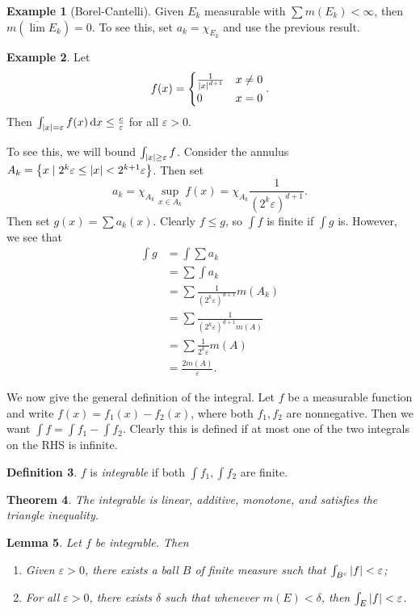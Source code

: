 \documentclass[leqno, openany]{memoir}
\newtheorem{thm}{Theorem}[chapter]
\newtheorem{lem}[thm]{Lemma}
\theoremstyle{definition}
\newtheorem{defn}[thm]{Definition}
\newtheorem{exm}[thm]{Example}
\theoremstyle{remark}
\theoremstyle{plain}
\theoremstyle{definition}
\theoremstyle{remark}
\newcommand{\ep}{\varepsilon}
\newcommand{\ol}[1]{\overline{#1}}
\begin{document}
\begin{exm}[Borel-Cantelli]
    Given $E_k$ measurable with $\sum m(E_k) < \infty$, then $m(\ol{\lim} E_k) = 0$. To see this, set $a_k = \chi_{E_k}$ and use the previous result.
\end{exm}

\begin{exm}
    Let 
    \[ f(x) = \begin{cases}
        \frac{1}{\abs{x}^{d+1}} & x \neq 0 \\
        0 & x = 0
    \end{cases}. \]
    Then $\int_{\abs{x}=\ep} f(x) \dd{x} \leq \frac{c}{\ep}$ for all $\ep > 0$.

    To see this, we will bound $\int_{\abs{x} \geq \ep} f$. Consider the annulus $A_k = \qty{x \mid 2^k \ep \leq \abs{x} < 2^{k+1} \ep}$. Then set
    \[ a_k = \chi_{A_k} \sup_{x \in A_k} f(x) = \chi_{A_k} \frac{1}{( 2^k \ep )^{d+1}}. \]
    Then set $g(x) = \sum a_k(x)$. Clearly $f \leq g$, so $\int f$ is finite if $\int g$ is. However, we see that
    \begin{align*}
        \int g &= \int \sum a_k \\
               &= \sum \int a_k \\
               &= \sum \frac{1}{(2^k \ep)^{d+1}} m(A_k) \\
               &= \sum \frac{1}{(2^k \ep)^{d+1} m(A)} \\
               &= \sum \frac{1}{2^k \ep} m(A) \\
               &= \frac{2m(A)}{\ep}.
    \end{align*}
\end{exm}

We now give the general definition of the integral. Let $f$ be a measurable function and write $f(x) = f_1(x) - f_2(x)$, where both $f_1, f_2$ are nonnegative. Then we want $\int f = \int f_1 - \int f_2$. Clearly this is defined if at most one of the two integrals on the RHS is infinite.

\begin{defn}
    $f$ is \textit{integrable} if both $\int f_1, \int f_2$ are finite.
\end{defn}

\begin{thm}
    The integrable is linear, additive, monotone, and satisfies the triangle inequality.
\end{thm}

\begin{lem}
    Let $f$ be integrable. Then
    \begin{enumerate}
        \item Given $\ep > 0$, there exists a ball $B$ of finite measure such that $\int_{B^c} \abs{f} < \ep$;
        \item For all $\ep > 0$, there exists $\delta$ such that whenever $m(E) < \delta$, then $\int_E \abs{f} < \ep$.
    \end{enumerate}
\end{lem}
\end{document}
